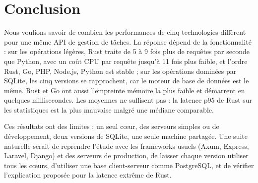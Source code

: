 \section{Conclusion}
Nous voulions savoir de combien les performances de cinq technologies diffèrent pour une même API de gestion de
tâches. La réponse dépend de la fonctionnalité : sur les opérations légères, Rust traite de 5 à 9 fois plus de
requêtes par seconde que Python, avec un coût CPU par requête jusqu'à 11 fois plus faible, et l'ordre Rust, Go, PHP,
Node.js, Python est stable ; sur les opérations dominées par SQLite, les cinq versions se rapprochent, car le moteur
de base de données est le même. Rust et Go ont aussi l'empreinte mémoire la plus faible et démarrent en quelques
millisecondes. Les moyennes ne suffisent pas : la latence p95 de Rust sur les statistiques est la plus mauvaise malgré
une médiane comparable.

Ces résultats ont des limites : un seul cœur, des serveurs simples ou de développement, deux versions de SQLite, une
seule machine partagée. Une suite naturelle serait de reprendre l'étude avec les frameworks usuels (Axum, Express,
Laravel, Django) et des serveurs de production, de laisser chaque version utiliser tous les cœurs, d'utiliser une
base client-serveur comme PostgreSQL, et de vérifier l'explication proposée pour la latence extrême de Rust.

